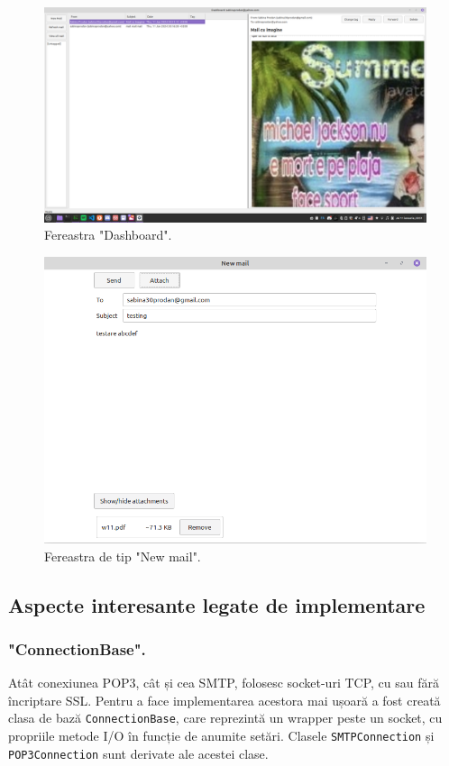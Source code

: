 \documentclass[runningheads]{llncs}
\begin{document}
\begin{figure}
    \centering
    \includegraphics[width=\textwidth]{dashboard.png}
    \caption{Fereastra "Dashboard".}
    \label{fig:dashboard}
\end{figure}

\begin{figure}
    \centering
    \includegraphics[width=\textwidth]{newMail.png}
    \caption{Fereastra de tip "New mail".}
    \label{fig:newmail}
\end{figure}

\newpage

\subsection{Aspecte interesante legate de implementare}

\subsubsection*{"ConnectionBase".} Atât conexiunea POP3, cât și cea SMTP, folosesc socket-uri TCP, cu sau fără încriptare SSL. Pentru a face implementarea acestora mai ușoară a fost creată clasa de bază \texttt{ConnectionBase}, care reprezintă un wrapper peste un socket, cu propriile metode I/O în funcție de anumite setări. Clasele \texttt{SMTPConnection} și \texttt{POP3Connection} sunt derivate ale acestei clase.
\end{document}
